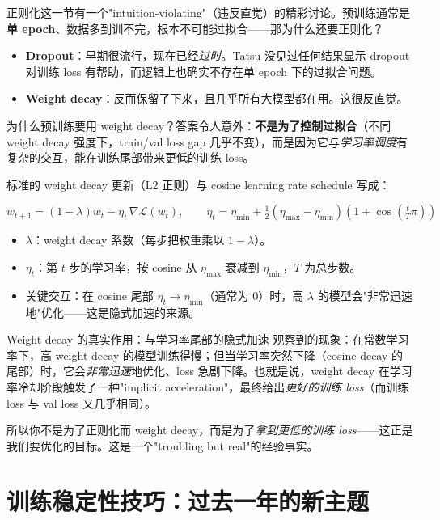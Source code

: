 \documentclass[a4paper]{article}
\begin{document}
正则化这一节有一个"intuition-violating"（违反直觉）的精彩讨论。预训练通常是\textbf{单 epoch}、数据多到训不完，根本不可能过拟合——那为什么还要正则化？

\begin{itemize}
    \item \textbf{Dropout}：早期很流行，现在已经\emph{过时}。Tatsu 没见过任何结果显示 dropout 对训练 loss 有帮助，而逻辑上也确实不存在单 epoch 下的过拟合问题。
    \item \textbf{Weight decay}：反而保留了下来，且几乎所有大模型都在用。这很反直觉。
\end{itemize}

为什么预训练要用 weight decay？答案令人意外：\textbf{不是为了控制过拟合}（不同 weight decay 强度下，train/val loss gap 几乎不变），而是因为它与\emph{学习率调度}有复杂的交互，能在训练尾部带来更低的训练 loss。

标准的 weight decay 更新（L2 正则）与 cosine learning rate schedule 写成：

\[
w_{t+1} = (1 - \lambda) w_t - \eta_t \, \nabla \mathcal{L}(w_t), \qquad
\eta_t = \eta_{\min} + \tfrac{1}{2}(\eta_{\max} - \eta_{\min})\left(1 + \cos\!\left(\tfrac{t}{T}\pi\right)\right)
\]

\begin{itemize}
    \item $\lambda$：weight decay 系数（每步把权重乘以 $1-\lambda$）。
    \item $\eta_t$：第 $t$ 步的学习率，按 cosine 从 $\eta_{\max}$ 衰减到 $\eta_{\min}$，$T$ 为总步数。
    \item 关键交互：在 cosine 尾部 $\eta_t \to \eta_{\min}$（通常为 0）时，高 $\lambda$ 的模型会"非常迅速地"优化——这是隐式加速的来源。
\end{itemize}

\begin{warningbox}{Weight decay 的真实作用：与学习率尾部的隐式加速}
观察到的现象：在常数学习率下，高 weight decay 的模型训练得慢；但当学习率突然下降（cosine decay 的尾部）时，它会\emph{非常迅速}地优化、loss 急剧下降。也就是说，weight decay 在学习率冷却阶段触发了一种"implicit acceleration"，最终给出\emph{更好的训练 loss}（而训练 loss 与 val loss 又几乎相同）。

所以你不是为了正则化而 weight decay，而是为了\emph{拿到更低的训练 loss}——这正是我们要优化的目标。这是一个"troubling but real"的经验事实。
\end{warningbox}

\section{训练稳定性技巧：过去一年的新主题}
\end{document}
